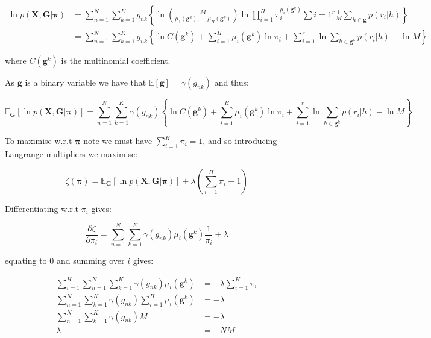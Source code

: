 \documentclass{article}
\begin{document}
\begin{align} 
    \ln p(\boldsymbol{X}, \boldsymbol{G} | \boldsymbol{\pi}) &= \sum_{n = 1}^N \sum_{k = 1}^K g_{nk} \left\{ \ln \binom{M}{\mu_1(\boldsymbol{g}^k),...,\mu_H(\boldsymbol{g}^k)} \ln \prod_{i = 1}^H \pi_i^{\mu_i(\boldsymbol{g}^k)} \sum{i = 1}^{r} \frac{1}{M} \sum_{h \in \boldsymbol{g}} p(r_i | h) \right\}\\
    &= \sum_{n = 1}^N \sum_{k = 1}^K g_{nk} \left\{ \ln C(\boldsymbol{g}^k) + \sum_{i = 1}^H \mu_i(\boldsymbol{g}^k) \ln \pi_i + \sum_{i = 1}^{r} \ln \sum_{h \in \boldsymbol{g}^k} p(r_i | h) - \ln M \right\}
\end{align}

where $C(\boldsymbol{g}^k)$ is the multinomial coefficient.

As $\boldsymbol{g}$ is a binary variable we have that $\mathbb{E}[\boldsymbol{g}] = \gamma(g_{nk})$ and thus:

\begin{equation} 
    \mathbb{E}_{\boldsymbol{G}} [\ln p(\boldsymbol{X}, \boldsymbol{G} | \boldsymbol{\pi})] = \sum_{n = 1}^N \sum_{k = 1}^K \gamma(g_{nk}) \left\{ \ln C(\boldsymbol{g}^k) + \sum_{i = 1}^H \mu_i(\boldsymbol{g}^k) \ln \pi_i + \sum_{i = 1}^{r} \ln \sum_{h \in \boldsymbol{g}^k} p(r_i | h) - \ln M \right\}
\end{equation}

To maximise w.r.t $\boldsymbol{\pi}$ note we must have $\sum_{i = 1}^H \pi_i = 1$, and so introducing Langrange multipliers we maximise:

\begin{equation} 
    \zeta(\boldsymbol{\pi}) = \mathbb{E}_{\boldsymbol{G}} [\ln p(\boldsymbol{X}, \boldsymbol{G} | \boldsymbol{\pi})] + \lambda \left( \sum_{i = 1}^H \pi_i - 1 \right)
\end{equation}

Differentiating w.r.t $\pi_i$ gives:

\begin{equation} 
   \frac{\partial \zeta}{\partial \pi_i} = \sum_{n = 1}^N \sum_{k = 1}^K \gamma(g_{nk}) \mu_i(\boldsymbol{g}^k) \frac{1}{\pi_i} + \lambda
\end{equation}

equating to $0$ and summing over $i$ gives:

\begin{align} 
    \sum_{i = 1}^H \sum_{n = 1}^N \sum_{k = 1}^K \gamma(g_{nk}) \mu_i(\boldsymbol{g}^k) &= -\lambda \sum_{i = 1}^H \pi_i \\
      \sum_{n = 1}^N \sum_{k = 1}^K \gamma(g_{nk}) \sum_{i = 1}^H  \mu_i(\boldsymbol{g}^k) &= -\lambda \\
      \sum_{n = 1}^N \sum_{k = 1}^K \gamma(g_{nk}) M &= -\lambda \\
      \lambda &= -NM
\end{align}
\end{document}

